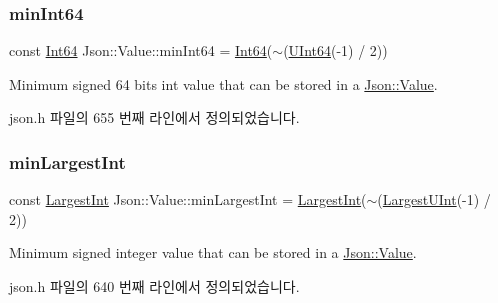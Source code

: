 \mbox{\label{class_json_1_1_value_a815ef899bc312c93bc426511acfe31a7}} 
\subsubsection{\texorpdfstring{min\+Int64}{minInt64}}
{\footnotesize\ttfamily const \hyperlink{class_json_1_1_value_a1b86af9f85f0f1baa972c3319fa22695}{Int64} Json\+::\+Value\+::min\+Int64 = \hyperlink{class_json_1_1_value_a1b86af9f85f0f1baa972c3319fa22695}{Int64}($\sim$(\hyperlink{class_json_1_1_value_a8b62564be8c087c6d18de180ff4e13e3}{U\+Int64}(-\/1) / 2))\hspace{0.3cm}{\ttfamily [static]}}



Minimum signed 64 bits int value that can be stored in a \hyperlink{class_json_1_1_value}{Json\+::\+Value}. 



json.\+h 파일의 655 번째 라인에서 정의되었습니다.

\mbox{\label{class_json_1_1_value_af91df130daa50dd43d2cd89e6ee67706}} 
\subsubsection{\texorpdfstring{min\+Largest\+Int}{minLargestInt}}
{\footnotesize\ttfamily const \hyperlink{class_json_1_1_value_a1cbb82642ed05109b9833e49f042ece7}{Largest\+Int} Json\+::\+Value\+::min\+Largest\+Int = \hyperlink{class_json_1_1_value_a1cbb82642ed05109b9833e49f042ece7}{Largest\+Int}($\sim$(\hyperlink{class_json_1_1_value_a6682a3684d635e03fc06ba229fa24eec}{Largest\+U\+Int}(-\/1) / 2))\hspace{0.3cm}{\ttfamily [static]}}



Minimum signed integer value that can be stored in a \hyperlink{class_json_1_1_value}{Json\+::\+Value}. 



json.\+h 파일의 640 번째 라인에서 정의되었습니다.

\mbox{\label{class_json_1_1_value_a21ddb05b92c60c7548e928bf371e7d45}} 
